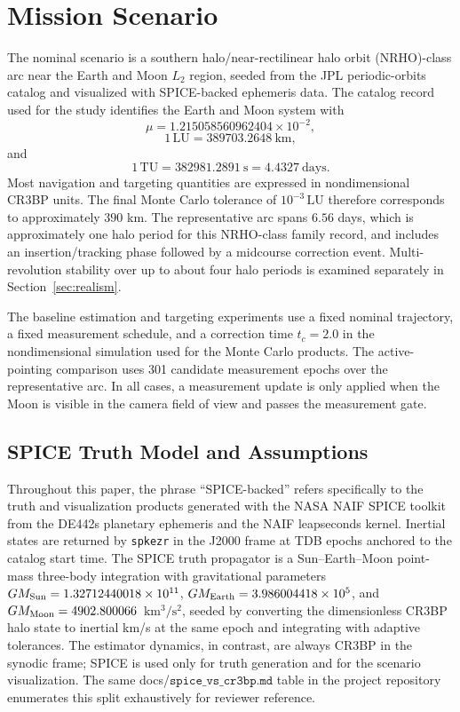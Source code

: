 \documentclass[10pt,twocolumn]{article}
\newcommand{\LU}{\mathrm{LU}}
\newcommand{\TU}{\mathrm{TU}}
\begin{document}
\section{Mission Scenario}
The nominal scenario is a southern halo/near-rectilinear halo orbit (NRHO)-class arc near the Earth and Moon $L_2$ region, seeded from the JPL periodic-orbits catalog and visualized with SPICE-backed ephemeris data.  The catalog record used for the study identifies the Earth and Moon system with
\[
\mu=1.215058560962404\times10^{-2},
\]
\[
1\,\LU=389703.2648\ \mathrm{km},
\]
and
\[
1\,\TU=382981.2891\ \mathrm{s}=4.4327\ \mathrm{days}.
\]
Most navigation and targeting quantities are expressed in nondimensional CR3BP units.  The final Monte Carlo tolerance of $10^{-3}\,\LU$ therefore corresponds to approximately $390$ km.  The representative arc spans $6.56$ days, which is approximately one halo period for this NRHO-class family record, and includes an insertion/tracking phase followed by a midcourse correction event.  Multi-revolution stability over up to about four halo periods is examined separately in Section~\ref{sec:realism}.

The baseline estimation and targeting experiments use a fixed nominal trajectory, a fixed measurement schedule, and a correction time $t_c=2.0$ in the nondimensional simulation used for the Monte Carlo products.  The active-pointing comparison uses 301 candidate measurement epochs over the representative arc.  In all cases, a measurement update is only applied when the Moon is visible in the camera field of view and passes the measurement gate.

\subsection{SPICE Truth Model and Assumptions}
\label{sec:spice}
Throughout this paper, the phrase ``SPICE-backed'' refers specifically to the truth and visualization products generated with the NASA NAIF SPICE toolkit~\cite{naif} from the DE442s planetary ephemeris and the NAIF leapseconds kernel.  Inertial states are returned by \texttt{spkezr} in the J2000 frame at TDB epochs anchored to the catalog start time.  The SPICE truth propagator is a Sun--Earth--Moon point-mass three-body integration with gravitational parameters $GM_{\rm Sun}=1.32712440018\times 10^{11}$, $GM_{\rm Earth}=3.986004418\times 10^{5}$, and $GM_{\rm Moon}=4902.800066$~$\mathrm{km^3/s^2}$, seeded by converting the dimensionless CR3BP halo state to inertial km/s at the same epoch and integrating with adaptive tolerances.  The estimator dynamics, in contrast, are always CR3BP in the synodic frame; SPICE is used only for truth generation and for the scenario visualization.  The same docs/$\texttt{spice\_vs\_cr3bp.md}$ table in the project repository enumerates this split exhaustively for reviewer reference.
\end{document}
